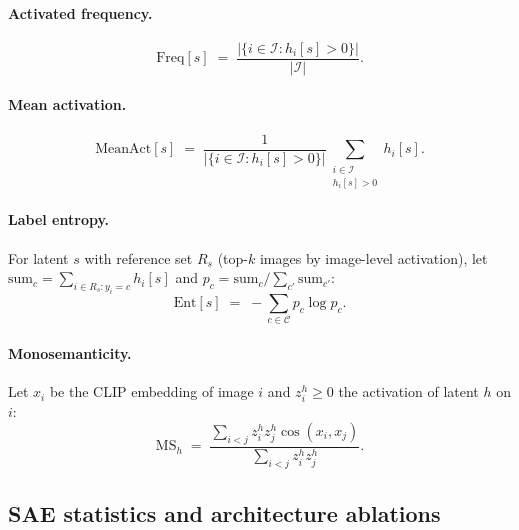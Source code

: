 \paragraph{Activated frequency.}
\begin{equation}
\mathrm{Freq}[s]
\;=\;
\frac{\left|\{i \in \mathcal{I} : h_i[s] > 0\}\right|}{|\mathcal{I}|}.
\label{eq:freq}
\end{equation}
 
\paragraph{Mean activation.}
\begin{equation}
\mathrm{MeanAct}[s]
\;=\;
\frac{1}{\left|\{i \in \mathcal{I} : h_i[s] > 0\}\right|}
\sum_{\substack{i \in \mathcal{I} \\ h_i[s] > 0}} h_i[s].
\label{eq:meanact}
\end{equation}
 
\paragraph{Label entropy.}
For latent $s$ with reference set $R_s$ (top-$k$ images by image-level activation), let $\mathrm{sum}_c = \sum_{i \in R_s : y_i = c} h_i[s]$ and $p_c = \mathrm{sum}_c / \sum_{c'} \mathrm{sum}_{c'}$:
\begin{equation}
\mathrm{Ent}[s]
\;=\;
-\sum_{c \in \mathcal{C}} p_c \log p_c.
\label{eq:entropy}
\end{equation}
 
\paragraph{Monosemanticity.}
Let $x_i$ be the CLIP embedding of image $i$ and $z_i^{h} \geq 0$ the activation of latent $h$ on $i$:
\begin{equation}
\mathrm{MS}_h
\;=\;
\frac{\sum_{i<j} z_i^{h} z_j^{h} \cos(x_i, x_j)}{\sum_{i<j} z_i^{h} z_j^{h}}.
\label{eq:monosemanticity}
\end{equation}


\subsection{SAE statistics and architecture ablations}







